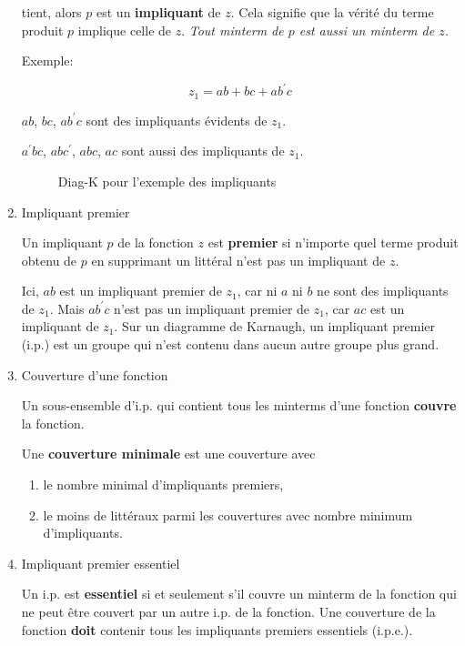 \documentclass[letter, oneside]{book}
\begin{document}
\begin{enumerate}
tient, alors \(p\) est un \textbf{impliquant} de \(z\). Cela signifie que la
vérité du terme produit \(p\) implique celle de \(z\). \emph{Tout minterm de
\(p\) est aussi un minterm de \(z\).}

Exemple:

$$z_1 = ab + bc + a b^{\prime} c$$

\(a b\), \(b c\), \(a b^{\prime} c\) sont des impliquants évidents de \(z_1\).

\(a^{\prime} b c\), \(a b c^{\prime}\), \(a b c\), \(a c\) sont aussi des
impliquants de \(z_1\).

\begin{figure}[htbp]
\centering

\caption{\label{fig:org7a44c41}Diag-K pour l'exemple des impliquants}
\end{figure}

\item Impliquant premier
\label{sec:orgaed8884}

Un impliquant \(p\) de la fonction \(z\) est \textbf{premier} si n'importe quel
terme produit obtenu de \(p\) en supprimant un littéral n'est pas un
impliquant de \(z\).

Ici, \(a b\) est un impliquant premier de \(z_1\), car ni \(a\) ni \(b\) ne
sont des impliquants de \(z_1\). Mais \(a b^{\prime} c\) n'est pas un
impliquant premier de \(z_1\), car \(a c\) est un impliquant de \(z_1\).
Sur un diagramme de Karnaugh, un impliquant premier (i.p.) est un
groupe qui n'est contenu dans aucun autre groupe plus grand.

\item Couverture d'une fonction
\label{sec:orgf052b19}

Un sous-ensemble d'i.p. qui contient tous les minterms d'une fonction
\textbf{couvre} la fonction.

Une \textbf{couverture minimale} est une couverture avec

\begin{enumerate}
\item le nombre minimal d'impliquants premiers,

\item le moins de littéraux parmi les couvertures avec nombre minimum
d'impliquants.
\end{enumerate}

\item Impliquant premier essentiel
\label{sec:org55af5c9}

Un i.p. est \textbf{essentiel} si et seulement s'il couvre un minterm de la
fonction qui ne peut être couvert par un autre i.p. de la fonction.
Une couverture de la fonction \textbf{doit} contenir tous les impliquants
premiers essentiels (i.p.e.).


\end{enumerate}
\end{document}
